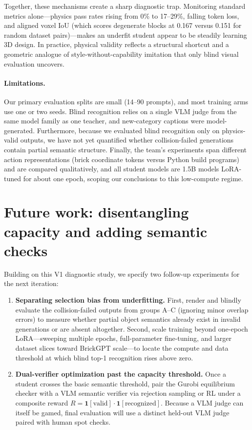 \documentclass{article}
\begin{document}
Together, these mechanisms create a sharp diagnostic trap. Monitoring standard metrics alone---physics pass rates rising from 0\% to 17--29\%, falling token loss, and aligned voxel IoU (which scores degenerate blocks at 0.167 versus 0.151 for random dataset pairs)---makes an underfit student appear to be steadily learning 3D design. In practice, physical validity reflects a structural shortcut \cite{geirhos2020shortcut} and a geometric analogue of style-without-capability imitation \cite{gudibande2023false} that only blind visual evaluation uncovers.

\paragraph{Limitations.} Our primary evaluation splits are small (14--90 prompts), and most training arms use one or two seeds. Blind recognition relies on a single VLM judge from the same model family as one teacher, and new-category captions were model-generated. Furthermore, because we evaluated blind recognition only on physics-valid outputs, we have not yet quantified whether collision-failed generations contain partial semantic structure. Finally, the team's experiments span different action representations (brick coordinate tokens versus Python build programs) and are compared qualitatively, and all student models are 1.5B models LoRA-tuned for about one epoch, scoping our conclusions to this low-compute regime.

\section{Future work: disentangling capacity and adding semantic checks}
\label{sec:future}
Building on this V1 diagnostic study, we specify two follow-up experiments for the next iteration:
\begin{enumerate}[leftmargin=*,itemsep=1pt]
\item \textbf{Separating selection bias from underfitting.} First, render and blindly evaluate the collision-failed outputs from groups A--C (ignoring minor overlap errors) to measure whether partial object semantics already exist in invalid generations or are absent altogether. Second, scale training beyond one-epoch LoRA---sweeping multiple epochs, full-parameter fine-tuning, and larger dataset slices toward BrickGPT scale---to locate the compute and data threshold at which blind top-1 recognition rises above zero.
\item \textbf{Dual-verifier optimization past the capacity threshold.} Once a student crosses the basic semantic threshold, pair the Gurobi equilibrium checker with a VLM semantic verifier via rejection sampling or RL under a composite reward $R = \mathbf 1[\text{valid}]\cdot\mathbf 1[\text{recognized}]$. Because a VLM judge can itself be gamed, final evaluation will use a distinct held-out VLM judge paired with human spot checks.
\end{enumerate}
\end{document}
